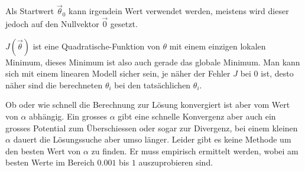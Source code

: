 Als Startwert $\vec\theta_0$ kann irgendein Wert verwendet werden, meistens wird dieser jedoch
auf den Nullvektor $\vec 0$ gesetzt.

$J(\vec \theta)$ ist eine Quadratische-Funktion von $\theta$ mit einem einzigen lokalen
Minimum, %
dieses Minimum ist also auch gerade das globale Minimum. Man kann sich mit einem linearen
Modell sicher sein, je näher der Fehler $J$ bei $0$ ist, desto näher sind die berechneten
$\theta_i$ bei den tatsächlichen $\theta_i$.

Ob oder wie schnell die Berechnung zur Lösung konvergiert ist aber vom Wert von $\alpha$
abhängig. Ein grosses $\alpha$ gibt eine schnelle Konvergenz aber auch ein grosses
Potential zum Überschiessen oder sogar zur Divergenz, bei einem kleinen $\alpha$ dauert
die Lösungssuche aber umso länger. Leider gibt es keine Methode um den besten Wert von
$\alpha$ zu finden. Er muss empirisch ermittelt werden, wobei am besten Werte im
Bereich $0.001$ bis $1$ auszuprobieren sind. \cite[S. 51]{ml:introduction-to-ml}